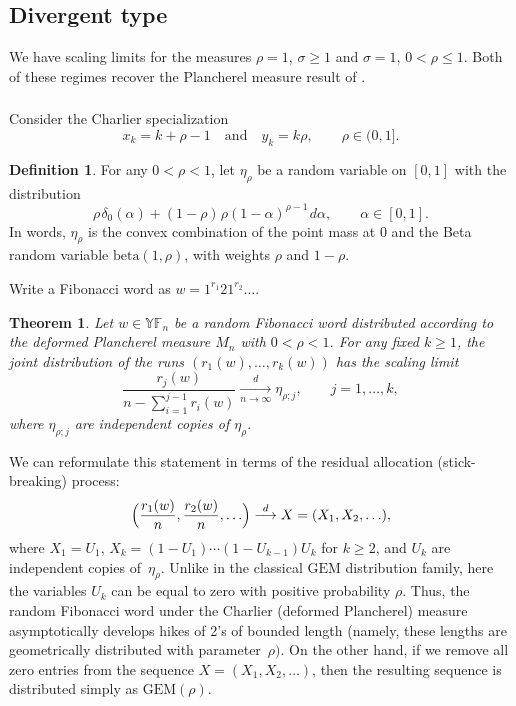\documentclass[letterpaper,11pt,oneside,reqno]{article}
\numberwithin{equation}{section}
\newcommand{\ssp}{\hspace{1pt}}
\newtheorem{theorem}[proposition]{Theorem}
\theoremstyle{definition}
\newtheorem{definition}[proposition]{Definition}
\begin{document}
\subsection{Divergent type}

We have scaling limits for the measures
$\rho=1$, $\sigma\ge1$
and
$\sigma=1$, $0<\rho\le 1$.
Both of these regimes recover the Plancherel measure
result of \cite{gnedin2000plancherel}.

\subsubsection{}

Consider the Charlier specialization
\begin{equation}
	x_k = k + \rho - 1 \quad \text{and} \quad y_k = k \rho ,\qquad  \rho \in (0, 1].
\end{equation}

\begin{definition}
	For any $0<\rho<1$,
	let $\eta_{\rho}$ be a random variable on $[0,1]$ with the distribution
	\begin{equation}
			\rho \ssp\delta_0(\alpha) + (1 - \rho)\ssp \rho (1 - \alpha)^{\rho - 1} \ssp d\alpha,\qquad
			\alpha\in[0,1].
	\end{equation}
	In words, $\eta_\rho$ is
	the convex combination of the point mass at $0$ and the Beta
	random variable $\mathrm{beta}(1, \rho)$, with weights
	$\rho$ and $1 - \rho$.
\end{definition}

Write a Fibonacci word as $w=1^{r_1}21^{r_2}\ldots $.

\begin{theorem}
	Let $w\in \mathbb{YF}_n$ be a random Fibonacci word distributed
	according to the deformed Plancherel measure $M_n$ with $0<\rho<1$.
	For any fixed $k\ge 1$, the joint distribution of the
	runs $(r_1(w), \ldots, r_k(w))$ has the scaling limit
	\begin{equation*}
		\frac{r_j(w)}{n-\sum_{i=1}^{j-1}r_i(w)}\xrightarrow[n\to\infty]{d}\eta_{\rho;j},\qquad j=1,\ldots,k,
	\end{equation*}
	where $\eta_{\rho;j}$ are independent copies of $\eta_\rho$.
\end{theorem}

We can
reformulate
this statement
in terms of the
residual allocation (stick-breaking) process:
\begin{equation*}
	\Bigl( \frac{r_1(w)}{n}, \frac{r_2(w)}{n}, \ldots \Bigr)
	\stackrel{d}{\longrightarrow}
	X=(X_1,X_2,\ldots ),
\end{equation*}
where $X_1=U_1$, $X_k=(1-U_1)\cdots (1-U_{k-1})U_k $ for $k\ge2$, and $U_k$
are independent copies of~$\eta_\rho$.
Unlike in the classical $\mathrm{GEM}$ distribution family, here
the variables $U_k$ can be equal to zero with positive probability $\rho$.
Thus, the random Fibonacci word
under the Charlier (deformed Plancherel) measure asymptotically
develops hikes of 2's of bounded length
(namely, these lengths are geometrically distributed with parameter~$\rho)$.
On the other hand, if we remove all
zero entries from the sequence
$X=(X_1,X_2,\ldots )$, then the resulting sequence is
distributed simply as $\mathrm{GEM}(\rho)$.
\end{document}
